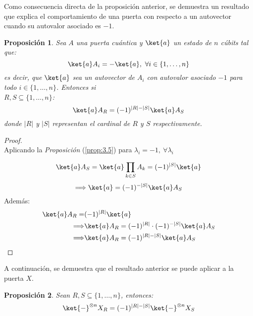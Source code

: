 \documentclass[10pt,conference,a4paper]{IEEEtran}
\newtheorem{prop}{Proposición}[section]
\providecommand{\abs}[1]{\lvert#1\rvert}
\begin{document}
\vspace{1.5mm}
Como consecuencia directa de la proposición anterior, se demuestra un resultado que explica el comportamiento de una puerta con respecto a un autovector cuando su autovalor asociado es $-1$.
\vspace{1.5mm}
\begin{prop}
    Sea $A$ una puerta cuántica y $\ket{a}$ un estado de $n$ cúbits tal que:
    $$\ket{a}A_i=-\ket{a},\ \forall i\in \{1,\ldots, n\}$$
    es decir, que $\ket{a}$ sea un autovector de $A_i$ con autovalor asociado $-1$ para todo $i\in \{1,\ldots, n\}$. Entonces si \\
    $R,S\subseteq\{1,\ldots, n\}$:
    \begin{equation}
        \ket{a}A_R=(-1)^{\abs{R}-\abs{S}}\ket{a}A_S
    \end{equation}
    \label{prop:4}
    donde $\abs{R}$ y $\abs{S}$ representan el cardinal de $R$ y $S$ respectivamente.
\end{prop}
\begin{proof}\\
    Aplicando la \textit{Proposición} (\ref{prop:3.5}) para $\lambda_i=-1,\ \forall \lambda_i$
        
    $$\ket{a}A_S=\ket{a}\displaystyle\prod_{k\in S}A_k=(-1)^{\abs{S}}\ket{a}$$
    $$\Longrightarrow \ket{a}=(-1)^{-\abs{S}}\ket{a}A_S$$
    Además: 
    \begin{align*}
    \ket{a}A_R =& (-1)^{\abs{R}}\ket{a}\\
    \Longrightarrow&\ket{a}A_R=(-1)^{\abs{R}}\cdot(-1)^{-\abs{S}}\ket{a}A_S\\
    \Longrightarrow &\ket{a}A_R=(-1)^{\abs{R}-\abs{S}}\ket{a}A_S
\end{align*}
    \end{proof}
\vspace{1.5mm}
A continuación, se demuestra que el resultado anterior se puede aplicar a la puerta $X$.
\vspace{1.5mm}
\begin{prop}
    Sean $R, S\subseteq \{1,\ldots, n\}$, entonces:
    \begin{equation}
       \ket{-}^{\otimes n} X_R=(-1)^{\abs{R}-\abs{S}}\ket{-}^{\otimes n}X_S
    \end{equation}
    \label{prop:5} 
\end{prop}
\end{document}
